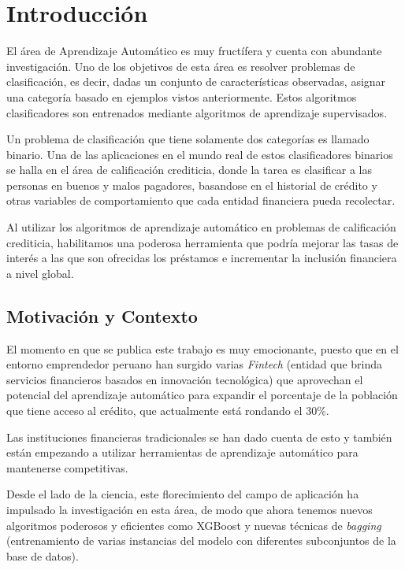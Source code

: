 \chapter{Introducción}

El área de Aprendizaje Automático es muy fructífera y cuenta con abundante investigación. Uno de los objetivos de esta área es resolver problemas de clasificación, es decir, dadas un conjunto de características observadas, asignar una categoría basado en ejemplos vistos anteriormente. Estos algoritmos clasificadores son entrenados mediante algoritmos de aprendizaje supervisados.

Un problema de clasificación que tiene solamente dos categorías es llamado binario. Una de las aplicaciones en el mundo real de estos clasificadores binarios se halla en el área de calificación crediticia, donde la tarea es clasificar a las personas en buenos y malos pagadores, basandose en el historial de crédito y otras variables de comportamiento que cada entidad financiera pueda recolectar.

Al utilizar los algoritmos de aprendizaje automático en problemas de calificación crediticia, habilitamos una poderosa herramienta que podría mejorar las tasas de interés a las que son ofrecidas los préstamos e incrementar la inclusión financiera a nivel global.

\section{Motivación y Contexto}

El momento en que se publica este trabajo es muy emocionante, puesto que en el entorno emprendedor peruano han surgido varias \textit{Fintech} (entidad que brinda servicios financieros basados en innovación tecnológica) que aprovechan el potencial del aprendizaje automático para expandir el porcentaje de la población que tiene acceso al crédito, que actualmente está rondando el 30\%.

Las instituciones financieras tradicionales se han dado cuenta de esto y también están empezando a utilizar herramientas de aprendizaje automático para mantenerse competitivas.

Desde el lado de la ciencia, este florecimiento del campo de aplicación ha impulsado la investigación en esta área, de modo que ahora tenemos nuevos algoritmos poderosos y eficientes como \ac{XGBoost} \cite{Chen:2016:XST:2939672.2939785} y nuevas técnicas de \textit{bagging} (entrenamiento de varias instancias del modelo con diferentes subconjuntos de la base de datos).

